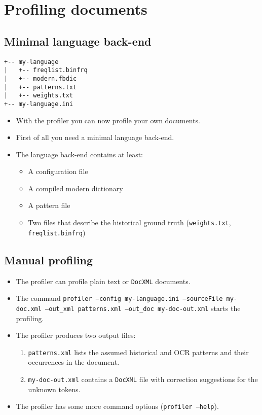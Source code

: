 \section{Profiling documents}
\subsection{Minimal language back-end}
\begin{frame}[fragile]
\begin{Verbatim}
+-- my-language
|   +-- freqlist.binfrq
|   +-- modern.fbdic
|   +-- patterns.txt
|   +-- weights.txt
+-- my-language.ini
\end{Verbatim}
	\begin{itemize}
		\item With the profiler you can now profile your own documents.
		\item First of all you need a minimal language back-end.
		\item The language back-end contains at least:
			\begin{itemize}
				\item A configuration file
				\item A compiled modern dictionary
				\item A pattern file
				\item Two files that describe the historical ground truth
					(\texttt{weights.txt}, \texttt{freqlist.binfrq})
			\end{itemize}
	\end{itemize}
\end{frame}

\subsection{Manual profiling}
\begin{frame}
	\begin{itemize}
		\item The profiler can profile plain text or \texttt{DocXML}
			documents.
		\item The command \texttt{profiler --config my-language.ini --sourceFile my-doc.xml
			--out\_xml patterns.xml --out\_doc my-doc-out.xml} starts the profiling.
		\item The profiler produces two output files:
			\begin{enumerate}
				\item \texttt{patterns.xml} lists the assumed historical and OCR
					patterns and their occurrences in the document.
				\item \texttt{my-doc-out.xml} contains a \texttt{DocXML} file with
					correction suggestions for the unknown tokens.
			\end{enumerate}
		\item The profiler has some more command options (\texttt{profiler --help}).
	\end{itemize}
\end{frame}

